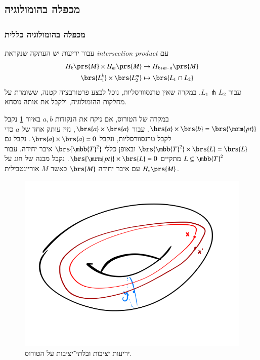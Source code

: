 \documentclass[a4paper,10pt,twoside,openany]{book}
\begin{document}
\subsection{מכפלה בהומולוגיה}

\subsubsection{מכפלה בהומולוגיה כללית}

עבור יריעות
יש העתקה שנקראת
\emph{\textenglish{intersection product}}
עם
\begin{align*}
H_k\prs{M} \times H_m\prs{M} &\to H_{k+m-n}\prs{M} \\
\brs{L_1^k} \times \brs{L_2^m} &\mapsto \brs{L_1 \cap L_2}
\end{align*}
עבור
$L_1 \pitchfork L_2$.
במקרה שאין טרנסוורסליות, נוכל לבצע פרטורבציה קטנה, ששומרת על מחלקות ההומולוגיה, ולקבל את אותה נוסחא.

במקרה של הטורוס, אם ניקח את הנקודות
$a,b$
באיור
\ref{7.6}
נקבל
$\brs{a} \times \brs{b} = \brs{\mrm{pt}}$.
עבור
$\brs{a} \times \brs{a}$,
נזיז עותק אחד של
$a$
כדי לקבל טרנסוורסליות, ונקבל
$\brs{a} \times \brs{a} = 0$.
נקבל גם
$\brs{\mbb{T}^2} \times \brs{L} = \brs{L}$
ובאופן כללי
$\brs{\mbb{T}^2}$
איבר יחידה.
עבור
$L \subsetneq \mbb{T}^2$
מתקיים
$\brs{\mrm{pt}} \times \brs{L} = 0$.
נקבל מבנה של חוג על
$H_*\prs{M}$
עם איבר יחידה
$\brs{M}$
כאשר
$M$
אוריינטבילית.

\begin{figure}
\centering
\includegraphics[scale=0.5]{sources/7.6}
\caption{יריעות יציבות ובלתי־יציבות על הטורוס.}
\label{7.6}
\end{figure}
\end{document}
